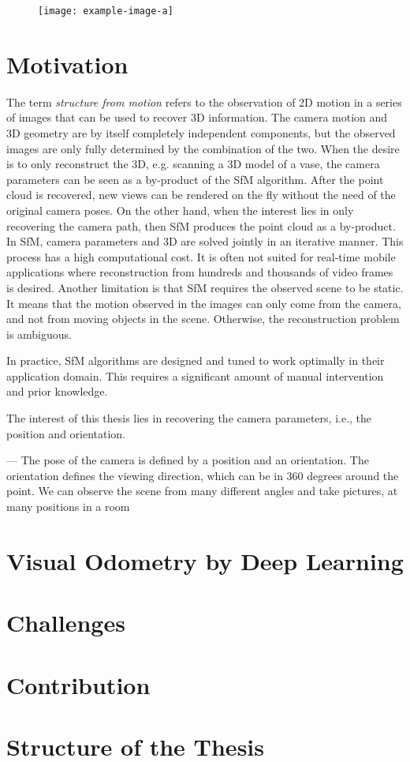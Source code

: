 	
	\begin{figure}
		\centering
		\texttt{[image: example-image-a]}
		\caption{\label{fig:sfm-example}}
	\end{figure}
		
	\section{Motivation}
		The term \emph{structure from motion} refers to the observation of 2D motion in a series of images that can be used to recover 3D information.
		The camera motion and 3D geometry are by itself completely independent components, but the observed images are only fully determined by the combination of the two.
		When the desire is to only reconstruct the 3D, e.g. scanning a 3D model of a vase, the camera parameters can be seen as a by-product of the SfM algorithm. 
		After the point cloud is recovered, new views can be rendered on the fly without the need of the original camera poses.
		On the other hand, when the interest lies in only recovering the camera path, then SfM produces the point cloud as a by-product.
		In SfM, camera parameters and 3D are solved jointly in an iterative manner.
		This process has a high computational cost.
		It is often not suited for real-time mobile applications where reconstruction from hundreds and thousands of video frames is desired.
		Another limitation is that SfM requires the observed scene to be static.
		It means that the motion observed in the images can only come from the camera, and not from moving objects in the scene.
		Otherwise, the reconstruction problem is ambiguous.
		
		In practice, SfM algorithms are designed and tuned to work optimally in their application domain.
		This requires a significant amount of manual intervention and prior knowledge.
		
		
		The interest of this thesis lies in recovering the camera parameters, i.e., the position and orientation.
		
	
	---
	The pose of the camera is defined by a position and an orientation.
	The orientation defines the viewing direction, which can be in 360 degrees around the point.
	We can observe the scene from many different angles and take pictures, at many positions in a room 
	
	\section{Visual Odometry by Deep Learning}
	
	
	
	\section{Challenges}
	
	\section{Contribution}
	
	\section{Structure of the Thesis}